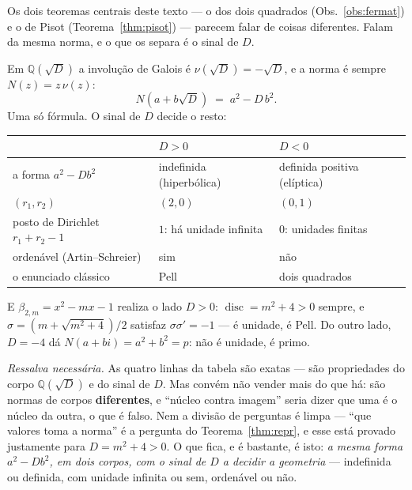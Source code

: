 \documentclass[11pt,a4paper]{article}
\theoremstyle{plain}
\theoremstyle{definition}
\theoremstyle{remark}
\newcommand{\Q}{\mathbb{Q}}
\begin{document}
Os dois teoremas centrais deste texto --- o dos dois quadrados (Obs.~\ref{obs:fermat}) e o de
Pisot (Teorema~\ref{thm:pisot}) --- parecem falar de coisas diferentes. Falam da mesma norma, e o
que os separa é o sinal de $D$.

Em $\Q(\sqrt D)$ a involução de Galois é $\nu(\sqrt D) = -\sqrt D$, e a norma é sempre
$N(z) = z\,\nu(z)$:
\[
  N(a+b\sqrt D) \;=\; a^2 - D\,b^2 .
\]
Uma só fórmula. O sinal de $D$ decide o resto:

\begin{center}\small
\begin{tabular}{lll}
\hline
 & $D>0$ & $D<0$ \\ \hline
a forma $a^2-Db^2$ & indefinida (hiperbólica) & definida positiva (elíptica) \\
$(r_1,r_2)$ & $(2,0)$ & $(0,1)$ \\
posto de Dirichlet $r_1{+}r_2{-}1$ & $1$: há unidade infinita & $0$: unidades finitas \\
ordenável (Artin--Schreier) & sim & não \\
o enunciado clássico & Pell & dois quadrados \\
\hline
\end{tabular}
\end{center}

\noindent E $\beta_{2,m}=x^2-mx-1$ realiza o lado $D>0$: $\operatorname{disc} = m^2+4>0$ sempre, e
$\sigma=(m+\sqrt{m^2+4})/2$ satisfaz $\sigma\sigma'=-1$ --- é unidade, é Pell. Do outro lado,
$D=-4$ dá $N(a+bi)=a^2+b^2=p$: não é unidade, é primo.

\emph{Ressalva necessária.} As quatro linhas da tabela são exatas --- são propriedades do corpo
$\Q(\sqrt D)$ e do sinal de $D$. Mas convém não vender mais do que há: são normas de corpos
\textbf{diferentes}, e ``núcleo contra imagem'' seria dizer que uma é o núcleo da outra, o que é
falso. Nem a divisão de perguntas é limpa --- ``que valores toma a norma'' é a pergunta do
Teorema~\ref{thm:repr}, e esse está provado justamente para $D = m^2+4 > 0$. O que fica, e é
bastante, é isto: \emph{a mesma forma $a^2-Db^2$, em dois corpos, com o sinal de $D$ a decidir a
geometria} --- indefinida ou definida, com unidade infinita ou sem, ordenável ou não.
\end{document}
